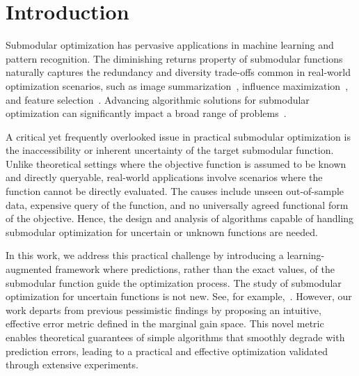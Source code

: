 \section{Introduction}

Submodular optimization has pervasive applications in machine learning and pattern recognition. The diminishing returns property of submodular functions naturally captures the redundancy and diversity trade-offs common in real-world optimization scenarios, such as image summarization~\cite{submodularOptNoisetoImageCollection}, influence maximization~\cite{mossel2010submodularity}, and feature selection~\cite{feature-selection}. Advancing algorithmic solutions for submodular optimization can significantly impact a broad range of problems~\cite{Krause_Golovin_2014}. 

A critical yet frequently overlooked issue in practical submodular optimization is the inaccessibility or inherent uncertainty of the target submodular function. Unlike theoretical settings where the objective function is assumed to be known and directly queryable, real-world applications involve scenarios where the function cannot be directly evaluated. The causes include unseen out-of-sample data, expensive query of the function, and no universally agreed functional form of the objective. Hence, the design and analysis of algorithms capable of handling submodular optimization for uncertain or unknown functions are needed. 

In this work, we address this practical challenge by introducing a learning-augmented framework where predictions, rather than the exact values, of the submodular function guide the optimization process. The study of submodular optimization for uncertain functions is not new. See, for example,~\cite{submodularOptNoisetoImageCollection,submodularOptNoise,horel2016maximization}. However, our work departs from previous pessimistic findings by proposing an intuitive, effective error metric defined in the marginal gain space. This novel metric enables theoretical guarantees of simple algorithms that smoothly degrade with prediction errors, leading to a practical and effective optimization validated through extensive experiments. 



